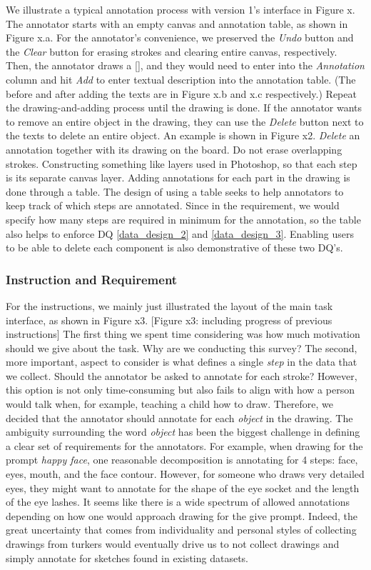 We illustrate a typical annotation process with version 1's interface in Figure x. 
The annotator starts with an empty canvas and annotation table, as shown in Figure x.a. For the annotator's convenience, we preserved the \textit{Undo} button and the \textit{Clear} button for erasing strokes and clearing entire canvas, respectively.  
Then, the annotator draws a [], and they would need to enter into the \textit{Annotation} column and hit \textit{Add} to enter textual description into the annotation table. (The before and after adding the texts are in Figure x.b and x.c respectively.)
Repeat the drawing-and-adding process until the drawing is done. 
If the annotator wants to remove an entire object in the drawing, they can use the \textit{Delete} button next to the texts to delete an entire object. An example is shown in Figure x2. \textit{Delete} an annotation together with its drawing on the board. Do not erase overlapping strokes. Constructing something like layers used in Photoshop, so that each step is its separate canvas layer. 
Adding annotations for each part in the drawing is done through a table. The design of using a table seeks to help annotators to keep track of which steps are annotated. Since in the requirement, we would specify how many steps are required in minimum for the annotation, so the table also helps to enforce DQ \ref{data_design_2} and \ref{data_design_3}. Enabling users to be able to delete each component is also demonstrative of these two DQ's. 



\subsubsection{Instruction and Requirement}
For the instructions, we mainly just illustrated the layout of the main task interface, as shown in Figure x3.
[Figure x3: including progress of previous instructions]
The first thing we spent time considering was how much motivation should we give about the task. Why are we conducting this survey? The second, more important, aspect to consider is what defines a single \textit{step} in the data that we collect. Should the annotator be asked to annotate for each stroke? However, this option is not only time-consuming but also fails to align with how a person would talk when, for example, teaching a child how to draw. Therefore, we decided that the annotator should annotate for each \textit{object} in the drawing. The ambiguity surrounding the word \textit{object} has been the biggest challenge in defining a clear set of requirements for the annotators. For example, when drawing for the prompt \textit{happy face}, one reasonable decomposition is annotating for 4 steps: face, eyes, mouth, and the face contour. However, for someone who draws very detailed eyes, they might want to annotate for the shape of the eye socket and the length of the eye lashes. It seems like there is a wide spectrum of allowed annotations depending on how one would approach drawing for the give prompt. Indeed, the great uncertainty that comes from individuality and personal styles of collecting drawings from turkers would eventually drive us to not collect drawings and simply annotate for sketches found in existing datasets.                    

